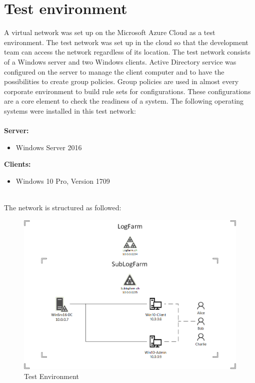 \section{Test environment}\label{sec:testenvironment}
A virtual network was set up on the Microsoft Azure Cloud as a test environment. The test network was set up in the cloud so that the development team can access the network regardless of its location. The test network consists of a Windows server and two Windows clients. Active Directory service was configured on the server to manage the client computer and to have the possibilities to create group policies. Group policies are used in almost every corporate environment to build rule sets for configurations. These configurations are a core element to check the readiness of a system. The following operating systems were installed in this test network: \\
\\
\textbf{Server:}
\begin{itemize}
    \item Windows Server 2016
\end{itemize}
\textbf{Clients:}
\begin{itemize}
    \item Windows 10 Pro, Version 1709
\end{itemize}
\ \\
The network is structured as followed:\\
\begin{figure}[H]
    \centering
    \includegraphics[width=0.9\linewidth]{assets/test-environment/testnetwork.png}
    \caption{Test Environment}
\end{figure}

\clearpage


